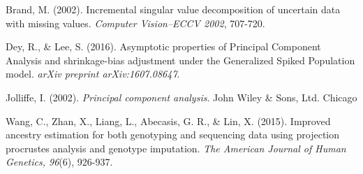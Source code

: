 \documentclass{article}[12pt]
\begin{document}
\begin{comment}
More specifically, Online PCA takes the following steps:




\subsection{HDPCA}

A simple way to compute the PC scores for the testing individual is $w^T = y^T U$.
However, the resulted PC scores tend to be smaller than the PC scores obtained from eigendecomposing $X'^T X$ where $X^T = (X, y)$.
This shrinking bias can be adjusted by the HDPCA package in R.
The algorithm is as follows:


\end{comment}

\newpage

\begin{thebibliography}{}
 
 Brand, M. (2002). Incremental singular value decomposition of uncertain data with missing values. {\it Computer Vision--ECCV 2002}, 707-720.

 Dey, R., \& Lee, S. (2016). Asymptotic properties of Principal Component Analysis and shrinkage-bias adjustment under the Generalized Spiked Population model. {\it arXiv preprint arXiv:1607.08647}.
  
 Jolliffe, I. (2002). {\it Principal component analysis}. John Wiley \& Sons, Ltd.
Chicago	


  Wang, C., Zhan, X., Liang, L., Abecasis, G. R., \& Lin, X. (2015). Improved ancestry estimation for both genotyping and sequencing data using projection procrustes analysis and genotype imputation. {\it The American Journal of Human Genetics, 96}(6), 926-937.

\end{thebibliography}
\end{document}
